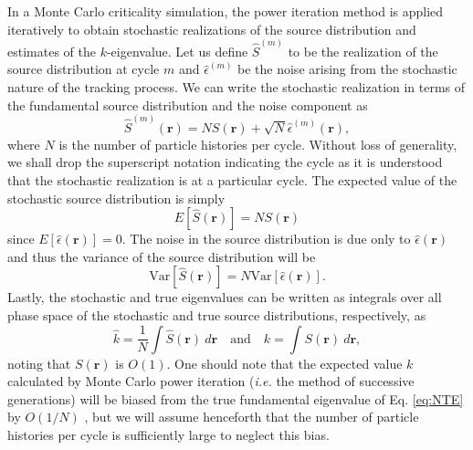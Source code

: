\documentclass[11pt]{article}
\begin{document}
In a Monte Carlo criticality simulation, the power iteration method is
applied iteratively to obtain stochastic realizations of the source
distribution and estimates of the $k$-eigenvalue. Let us define
$\hat{S}^{(m)}$ to be the realization of the source distribution at
cycle $m$ and $\hat{\epsilon}^{(m)}$ be the noise arising from the
stochastic nature of the tracking process. We can write the stochastic
realization in terms of the fundamental source distribution and the
noise component as \cite{brissenden}
\begin{equation}\label{eq:source}
  \hat{S}^{(m)}(\mathbf{r})= N S(\mathbf{r}) + \sqrt{N}
  \hat{\epsilon}^{(m)}(\mathbf{r}),
\end{equation}
where $N$ is the number of particle histories per cycle. Without loss
of generality, we shall drop the superscript notation indicating the
cycle as it is understood that the stochastic realization is at a
particular cycle. The expected value of the stochastic source
distribution is simply
\begin{equation}
  E \left[ \hat{S}(\mathbf{r})\right] = N S (\mathbf{r})
\end{equation}
since $E \left[ \hat{\epsilon}(\mathbf{r})\right] = 0$. The noise in
the source distribution is due only to $\hat{\epsilon}(\mathbf{r})$
and thus the variance of the source distribution will be
\begin{equation}
  \text{Var} \left[ \hat{S}(\mathbf{r})\right] = N \text{Var} \left[
    \hat{\epsilon}(\mathbf{r}) \right].
\end{equation}
Lastly, the stochastic and true eigenvalues can be written as
integrals over all phase space of the stochastic and true source
distributions, respectively, as
\begin{equation}\label{eq:k_to_source}
  \hat{k} = \frac{1}{N} \int \hat{S}(\mathbf{r}) \: d\mathbf{r} \quad
  \text{and} \quad k = \int S(\mathbf{r}) \: d\mathbf{r},
\end{equation}
noting that $S(\mathbf{r})$ is $O(1)$. One should note that the
expected value $k$ calculated by Monte Carlo power iteration
(\emph{i.e.} the method of successive generations) will be biased from
the true fundamental eigenvalue of Eq. \ref{eq:NTE} by $O(1/N)$
\cite{brissenden}, but we will assume henceforth that the number of
particle histories per cycle is sufficiently large to neglect this
bias.
\end{document}

